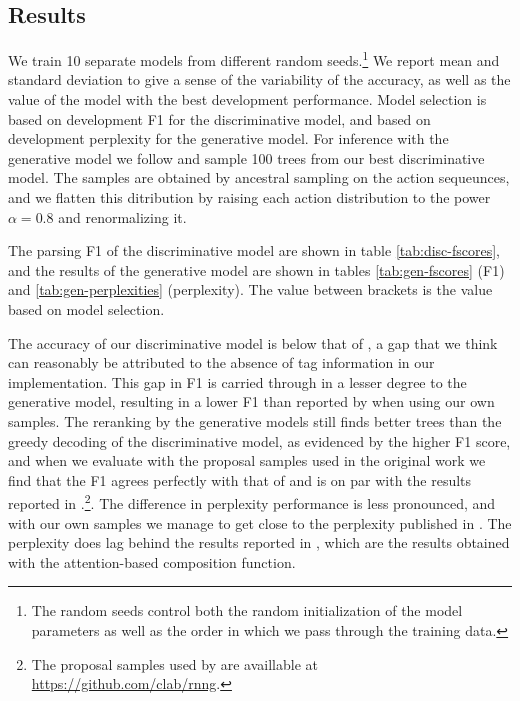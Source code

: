   \subsection{Results}
    We train 10 separate models from different random seeds.\footnote{The random seeds control both the random initialization of the model parameters as well as the order in which we pass through the training data.} We report mean and standard deviation to give a sense of the variability of the accuracy, as well as the value of the model with the best development performance. Model selection is based on development F1 for the discriminative model, and based on development perplexity for the generative model. For inference with the generative model we follow \citet{dyer2016rnng} and sample 100 trees from our best discriminative model. The samples are obtained by ancestral sampling on the action sequeunces, and we flatten this ditribution by raising each action distribution to the power $\alpha = 0.8$ and renormalizing it.

    The parsing F1 of the discriminative model are shown in table \ref{tab:disc-fscores}, and the results of the generative model are shown in tables \ref{tab:gen-fscores} (F1) and \ref{tab:gen-perplexities} (perplexity). The value between brackets is the value based on model selection.

    

    

    

    The accuracy of our discriminative model is below that of \citet{dyer2016rnng}, a gap that we think can reasonably be attributed to the absence of tag information in our implementation. This gap in F1 is carried through in a lesser degree to the generative model, resulting in a lower F1 than reported by \citet{dyer2016rnng} when using our own samples. The reranking by the generative models still finds better trees than the greedy decoding of the discriminative model, as evidenced by the higher F1 score, and when we evaluate with the proposal samples used in the original work we find that the F1 agrees perfectly with that of \citet{dyer2016rnng} and is on par with the results reported in \citet{kuncoro2017syntax}.\footnote{The proposal samples used by \citet{dyer2016rnng} are availlable at \url{https://github.com/clab/rnng}.}. The difference in perplexity performance is less pronounced, and with our own samples we manage to get close to the perplexity published in \citet{dyer2016rnng}. The perplexity does lag behind the results reported in \citet{kuncoro2017syntax}, which are the results obtained with the attention-based composition function.

